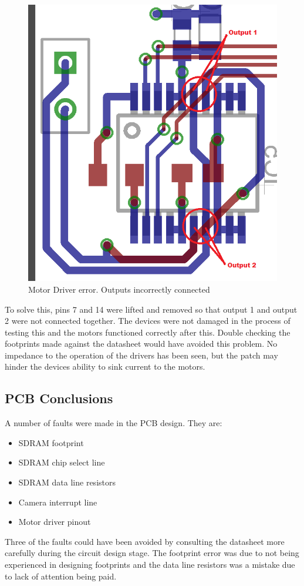\begin{figure}
\centering
\includegraphics[width = \textwidth /2]{./Figures/MotorDriver_error.png}
\caption{Motor Driver error. Outputs incorrectly connected}
\label{fig:Motor:Error}
\end{figure}

To solve this, pins 7 and 14 were lifted and removed so that output 1 and output 2 were not connected together. The devices were not damaged in the process of testing this and the motors functioned correctly after this. Double checking the footprints made against the datasheet would have avoided this problem. No impedance to the operation of the drivers has been seen, but the patch may hinder the devices ability to sink current to the motors. 

\subsection{PCB Conclusions}
A number of faults were made in the PCB design. They are:
\begin{itemize}
\item SDRAM footprint
\item SDRAM chip select line
\item SDRAM data line resistors
\item Camera interrupt line
\item Motor driver pinout
\end{itemize}
Three of the faults could have been avoided by consulting the datasheet more carefully during the circuit design stage. The footprint error was due to not being experienced in designing footprints and the data line resistors was a mistake due to lack of attention being paid. 

